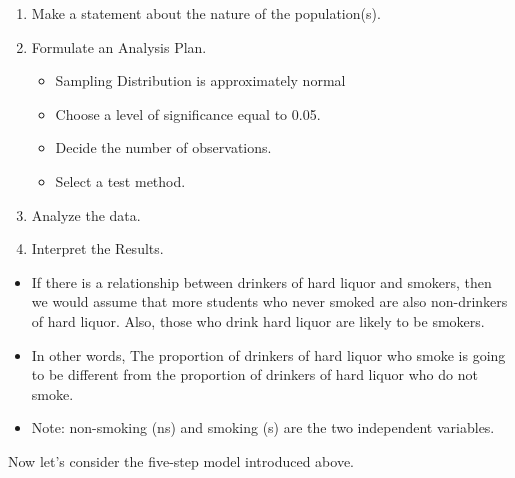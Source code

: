 \documentclass[11pt]{book}\usepackage[]{graphicx}\usepackage[]{color}
\begin{document}
\begin{enumerate}
\item Make a statement about the nature of the population(s).
\item Formulate an Analysis Plan.

  \begin{itemize}
  \item Sampling Distribution is approximately normal
  \item Choose a level of significance equal to 0.05.
  \item Decide the number of observations.
  \item Select a test method.
  \end{itemize}

\item Analyze the data.
\item Interpret the Results.
\end{enumerate}


\begin{itemize}
\item If there is a relationship between drinkers of hard liquor and smokers, then we would assume that more students who never smoked are also non-drinkers of hard liquor. Also, those who drink hard liquor are likely to be smokers.
\item In other words, The proportion of drinkers of hard liquor who smoke is going to be different from the proportion of drinkers of hard liquor who do not smoke.
\item Note: non-smoking (ns) and smoking (s) are the two independent variables.
\end{itemize}

Now let's consider the five-step model introduced above.
\end{document}

